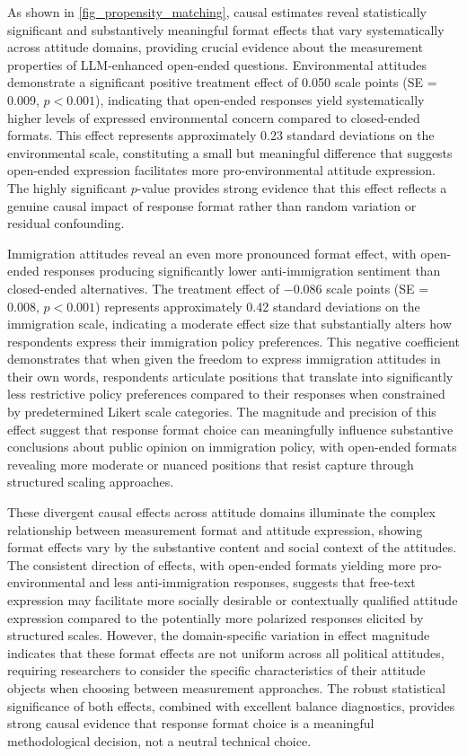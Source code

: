 \documentclass[
  journal=ram,
  manuscript=article-type,
  year=2025,
  volume=unpublished,
]{cup-journal}
\begin{document}
As shown in \ref{fig_propensity_matching}, causal estimates reveal statistically significant and substantively meaningful format effects that vary systematically across attitude domains, providing crucial evidence about the measurement properties of LLM-enhanced open-ended questions.
Environmental attitudes demonstrate a significant positive treatment effect of 0.050 scale points (SE = 0.009, $p < 0.001$), indicating that open-ended responses yield systematically higher levels of expressed environmental concern compared to closed-ended formats.
This effect represents approximately 0.23 standard deviations on the environmental scale, constituting a small but meaningful difference that suggests open-ended expression facilitates more pro-environmental attitude expression.
The highly significant $p$-value provides strong evidence that this effect reflects a genuine causal impact of response format rather than random variation or residual confounding.

Immigration attitudes reveal an even more pronounced format effect, with open-ended responses producing significantly lower anti-immigration sentiment than closed-ended alternatives.
The treatment effect of $-0.086$ scale points (SE = 0.008, $p < 0.001$) represents approximately 0.42 standard deviations on the immigration scale, indicating a moderate effect size that substantially alters how respondents express their immigration policy preferences.
This negative coefficient demonstrates that when given the freedom to express immigration attitudes in their own words, respondents articulate positions that translate into significantly less restrictive policy preferences compared to their responses when constrained by predetermined Likert scale categories.
The magnitude and precision of this effect suggest that response format choice can meaningfully influence substantive conclusions about public opinion on immigration policy, with open-ended formats revealing more moderate or nuanced positions that resist capture through structured scaling approaches.

These divergent causal effects across attitude domains illuminate the complex relationship between measurement format and attitude expression, showing format effects vary by the substantive content and social context of the attitudes.
The consistent direction of effects, with open-ended formats yielding more pro-environmental and less anti-immigration responses, suggests that free-text expression may facilitate more socially desirable or contextually qualified attitude expression compared to the potentially more polarized responses elicited by structured scales.
However, the domain-specific variation in effect magnitude indicates that these format effects are not uniform across all political attitudes, requiring researchers to consider the specific characteristics of their attitude objects when choosing between measurement approaches.
The robust statistical significance of both effects, combined with excellent balance diagnostics, provides strong causal evidence that response format choice is a meaningful methodological decision, not a neutral technical choice.
\end{document}
